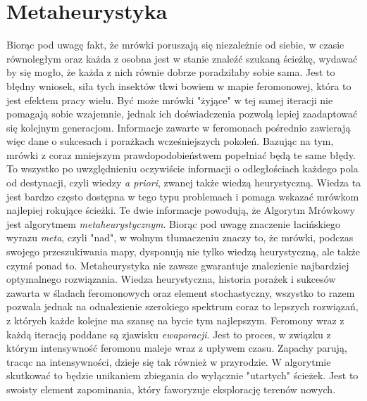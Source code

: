 \documentclass[printmode, openany, oneside, eng]{mgr}
\begin{document}
\section{Metaheurystyka}\label{sec:algorytmMetaH}
Biorąc pod uwagę fakt, że mrówki poruszają się niezależnie od siebie, w czasie równoległym oraz każda z osobna jest w stanie znaleźć szukaną ścieżkę, wydawać by się mogło, że każda z nich równie dobrze poradziłaby sobie sama. Jest to błędny wniosek, siła tych insektów tkwi bowiem w mapie feromonowej, która to jest efektem pracy wielu. Być może mrówki "żyjące" w tej samej iteracji nie pomagają sobie wzajemnie, jednak ich doświadczenia pozwolą lepiej zaadaptować się kolejnym generacjom. Informacje zawarte w feromonach pośrednio zawierają więc dane o sukcesach i porażkach wcześniejszych pokoleń. Bazując na tym, mrówki z coraz mniejszym prawdopodobieństwem popełniać będą te same błędy. To wszystko po uwzględnieniu oczywiście informacji o odległościach każdego pola od destynacji, czyli wiedzy \textit{a priori}, zwanej także wiedzą heurystyczną. Wiedza ta jest bardzo często dostępna w tego typu problemach i pomaga wskazać mrówkom najlepiej rokujące ścieżki. Te dwie informacje powodują, że Algorytm Mrówkowy jest algorytmem \textit{metaheurystycznym}. Biorąc pod uwagę znaczenie łacińskiego wyrazu \textit{meta}, czyli "nad", w wolnym tłumaczeniu znaczy to, że mrówki, podczas swojego przeszukiwania mapy, dysponują nie tylko wiedzą heurystyczną, ale także czymś ponad to. Metaheurystyka nie zawsze gwarantuje znalezienie najbardziej optymalnego rozwiązania. Wiedza heurystyczna, historia porażek i sukcesów zawarta w śladach feromonowych oraz element stochastyczny, wszystko to razem pozwala jednak na odnalezienie szerokiego spektrum coraz to lepszych rozwiązań, z których każde kolejne ma szansę na bycie tym najlepszym.
\newline 
Feromony wraz z każdą iteracją poddane są zjawisku \textit{ewaporacji}. Jest to proces, w związku z którym intensywność feromonu maleje wraz z upływem czasu. Zapachy parują, tracąc na intensywności, dzieje się tak również w przyrodzie. W algorytmie skutkować to będzie unikaniem zbiegania do wyłącznie "utartych" ścieżek. Jest to swoisty element zapominania, który faworyzuje eksplorację terenów nowych. 
\newline 
\end{document}
